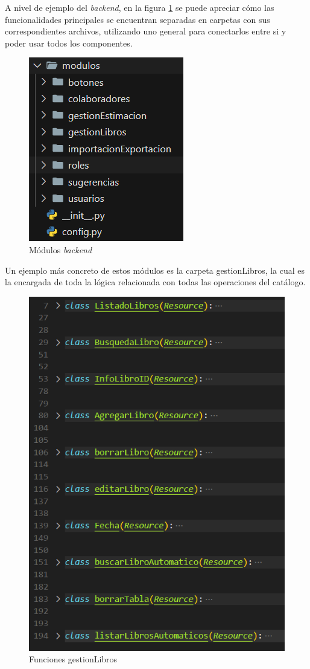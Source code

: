 A nivel de ejemplo del \textit{backend}, en la figura \ref{Módulos backend} se puede apreciar cómo las funcionalidades principales se encuentran separadas en carpetas con sus correspondientes archivos, utilizando uno general para conectarlos entre si y poder usar todos los componentes.

\begin{figure}
    \centering
    \includegraphics[width=0.5\linewidth]{Imagenes/Modulos.png}
    \caption{Módulos \textit{backend}}
    \label{Módulos backend}
\end{figure}


Un ejemplo más concreto de estos módulos es la carpeta gestionLibros, la cual es la encargada de toda la lógica relacionada con todas las operaciones del catálogo.

\begin{figure}[htbp]
    \centering
    \includegraphics[width=0.5\linewidth]{Imagenes/Ejemplo gestionLibros.png}
    \caption{Funciones gestionLibros}
    \label{Funciones gestionLibros}
\end{figure}
\FloatBarrier

